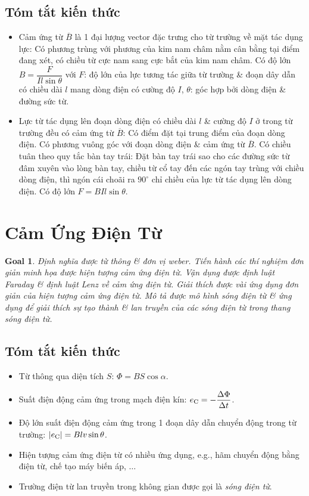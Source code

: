 \documentclass{article}
\newtheorem{goal}{Goal}
\begin{document}
\subsection{Tóm tắt kiến thức}

\begin{itemize}
	\item Cảm ứng từ $\overline{B}$ là 1 đại lượng vector đặc trưng cho từ trường về mặt tác dụng lực: Có phương trùng với phương của kim nam châm nằm cân bằng tại điểm đang xét, có chiều từ cực nam sang cực bắt của kim nam châm. Có độ lớn $B = \dfrac{F}{Il\sin\theta}$ với $F$: độ lớn của lực tương tác giữa từ trường \& đoạn dây dẫn có chiều dài $l$ mang dòng điện có cường độ $I$, $\theta$: góc hợp bởi dòng điện \& đường sức từ.
	\item Lực từ tác dụng lên đoạn dòng điện có chiều dài $l$ \& cường độ $I$ ở trong từ trường đều có cảm ứng từ $\overline{B}$: Có điểm đặt tại trung điểm của đoạn dòng điện. Có phương vuông góc với đoạn dòng điện \& cảm ứng từ $\overline{B}$. Có chiều tuân theo quy tắc bàn tay trái: Đặt bàn tay trái sao cho các đường sức từ đâm xuyên vào lòng bàn tay, chiều từ cổ tay đến các ngón tay trùng với chiều dòng điện, thì ngón cái choãi ra $90^\circ$ chỉ chiều của lực từ tác dụng lên dòng điện. Có độ lớn $F = BIl\sin\theta$.
\end{itemize}


\section{Cảm Ứng Điện Từ}

\begin{goal}
	Định nghĩa được từ thông \& đơn vị weber. Tiến hành các thí nghiệm đơn giản minh họa được hiện tượng cảm ứng điện từ. Vận dụng được định luật Faraday \& định luật Lenz về cảm ứng điện từ. Giải thích được vài ứng dụng đơn giản của hiện tượng cảm ứng điện từ. Mô tả được mô hình sóng điện từ \& ứng dụng để giải thích sự tạo thành \& lan truyền của các sóng điện từ trong thang sóng điện từ.
\end{goal}

\subsection{Tóm tắt kiến thức}

\begin{itemize}
	\item Từ thông qua diện tích $S$: $\Phi = BS\cos\alpha$.
	\item Suất điện động cảm ứng trong mạch điện kín: $e_{\rm C} = -\dfrac{\Delta\Phi}{\Delta t}$.
	\item Độ lớn suất điện động cảm ứng trong 1 đoạn dây dẫn chuyển động trong từ trường: $|e_{\rm C}| = Blv\sin\theta$.
	\item Hiện tượng cảm ứng điện từ có nhiều ứng dụng, e.g., hãm chuyển động bằng điện từ, chế tạo máy biến áp, $\ldots$
	\item Trường điện từ lan truyền trong không gian được gọi là {\it sóng điện từ}.
\end{itemize}
\end{document}
